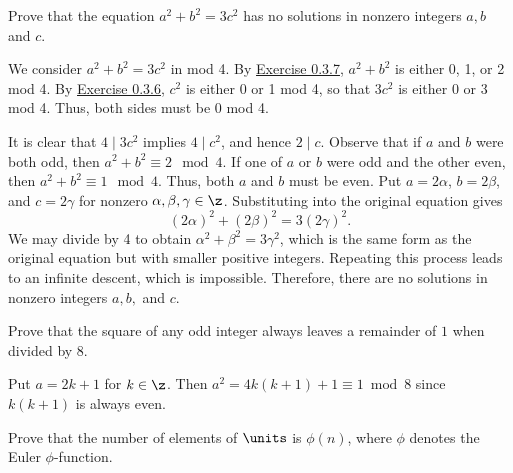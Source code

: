 \begin{exercise}\label{ex0.3.8}
    Prove that the equation $a^2 + b^2 = 3c^2$ has no solutions in nonzero integers $a, b$ and $c$.
    
\end{exercise}

\begin{sol}
    We consider $a^2 + b^2 = 3c^2$ in mod 4. By \hyperref[ex0.3.7]{Exercise 0.3.7}, $a^2 + b^2$ is either 0, 1, or 2 mod 4. By \hyperref[ex0.3.6]{Exercise 0.3.6}, $c^2$ is either 0 or 1 mod 4, so that $3c^2$ is either 0 or 3 mod 4. Thus, both sides must be 0 mod 4.

    It is clear that $4 \mid 3 c^2$ implies $4 \mid c^2$, and hence $2 \mid c$. Observe that if $a$ and $b$ were both odd, then $a^2 + b^2 \equiv 2 \mod 4$. If one of $a$ or $b$ were odd and the other even, then $a^2 + b^2 \equiv 1 \mod 4$. Thus, both $a$ and $b$ must be even. Put $a = 2\alpha$, $b = 2\beta$, and $c = 2\gamma$ for nonzero $\alpha, \beta, \gamma \in \z$. Substituting into the original equation gives
    \[ (2\alpha)^2 + (2\beta)^2 = 3(2\gamma)^2.\]
    We may divide by 4 to obtain $\alpha^2 + \beta^2 = 3\gamma^2$, which is the same form as the original equation but with smaller positive integers. Repeating this process leads to an infinite descent, which is impossible. Therefore, there are no solutions in nonzero integers $a, b,$ and $c$.
\end{sol}

\begin{exercise}\label{ex0.3.9}
    Prove that the square of any odd integer always leaves a remainder of $1$ when divided by $8$.
\end{exercise}

\begin{sol}
    Put $a = 2k + 1$ for $k \in \z$. Then $a^2 = 4k(k + 1) + 1 \equiv 1 \bmod 8$ since $k(k + 1)$ is always even.
\end{sol}

\begin{specialexercise}\label{ex0.3.10}
    Prove that the number of elements of $\units$ is $\phi(n)$, where $\phi$ denotes the Euler $\phi$-function.
\end{specialexercise}

